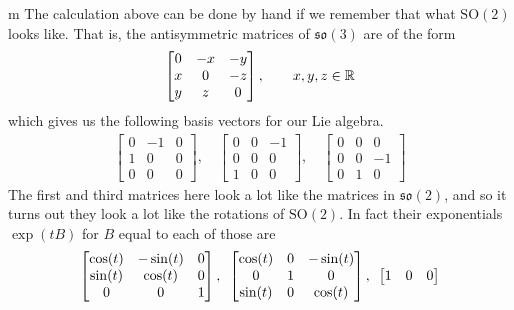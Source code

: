 \documentclass[11pt]{article}
\begin{document}
\begin{example}{m}
The calculation above can be done by hand if we remember that what $\mathrm{SO}(2)$ looks like. That is, the antisymmetric matrices of $\mathfrak{so}(3)$ are of the form \begin{gather*}
\begin{bmatrix}
0 & -x & -y \\
x & 0 & -z \\
y & z & 0
\end{bmatrix}, \hspace{2em} x,y,z\in \mathbb{R}
\end{gather*}
which gives us the following basis vectors for our Lie algebra. \begin{gather*}
\begin{bmatrix}
0 & -1 & 0 \\
1 & 0 & 0 \\
0 & 0 & 0
\end{bmatrix}, \hspace{1em} \begin{bmatrix}
0 & 0 & -1 \\
0 & 0 & 0 \\
1 & 0 & 0
\end{bmatrix}, \hspace{1em} \begin{bmatrix}
0 & 0 & 0 \\
0 & 0 & -1 \\
0 & 1 & 0
\end{bmatrix}
\end{gather*}
The first and third matrices here look a lot like the matrices in $\mathfrak{so}(2)$, and so it turns out they look a lot like the rotations of $\mathrm{SO}(2)$. In fact their exponentials $\exp(tB)$ for $B$ equal to each of those are \begin{gather*}
\begin{bmatrix}
\cos(t) & -\sin(t) & 0 \\
\sin(t) & \cos(t) & 0 \\
0 & 0 & 1
\end{bmatrix}, \hspace{0.5em} \begin{bmatrix}
\cos(t) & 0 & -\sin(t) \\
0 & 1 & 0 \\
\sin(t) & 0 & \cos(t)
\end{bmatrix}, \hspace{0.5em} \begin{bmatrix}
1 & 0 & 0 \\

\end{bmatrix}
\end{gather*}
\end{example}
\end{document}
